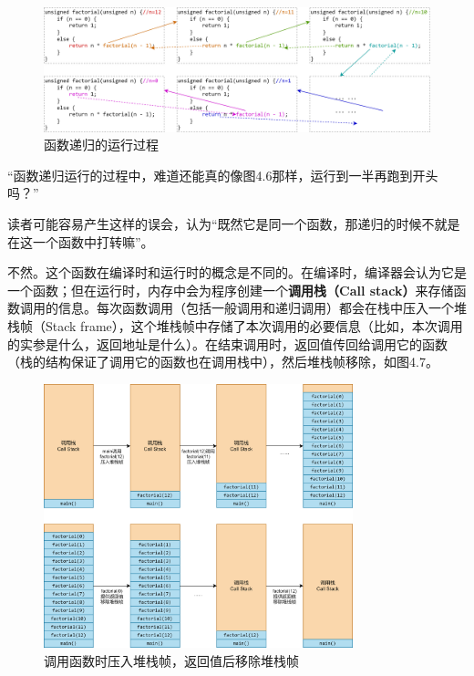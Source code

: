 \begin{figure}[htbp]
    \centering
    \includegraphics[width=\textwidth]{../images/generalized_parts/04_the_process_of_recursion.drawio.png}
    \caption{\lstinline@factorial@ 函数递归的运行过程}
\end{figure}
{\kaishu ``函数递归运行的过程中，难道还能真的像图4.6那样，运行到一半再跑到开头吗？''}\par
读者可能容易产生这样的误会，认为``既然它是同一个函数，那递归的时候不就是在这一个函数中打转嘛''。\par
不然。这个函数在编译时和运行时的概念是不同的。在编译时，编译器会认为它是一个函数；但在运行时，内存中会为程序创建一个\textbf{调用栈（Call stack）}来存储函数调用的信息。每次函数调用（包括一般调用和递归调用）都会在栈中压入一个堆栈帧（Stack frame），这个堆栈帧中存储了本次调用的必要信息（比如，本次调用的实参是什么，返回地址是什么）。在结束调用时，返回值传回给调用它的函数（栈的结构保证了调用它的函数也在调用栈中），然后堆栈帧移除，如图4.7。\par
\begin{figure}[htbp]
    \centering
    \includegraphics[width=0.8\textwidth]{.//images/generalized_parts/04_call_stack_structure.drawio.png}
    \caption{调用函数时压入堆栈帧，返回值后移除堆栈帧}    
\end{figure}
